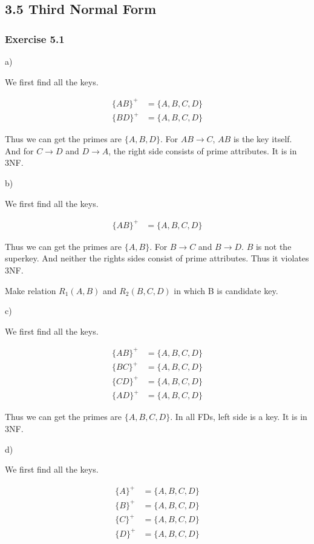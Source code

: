 \documentclass[../../main.tex]{subfiles}
\begin{document}
\subsection{3.5 Third Normal Form}

\subsubsection*{Exercise 5.1}

a)

We first find all the keys.

\begin{align*}
  \{AB\}^{+} &= \{A,B,C,D\} \\
  \{BD\}^{+} &= \{A,B,C,D\}
\end{align*}

Thus we can get the primes are $\{A, B, D\}$. For $AB \to C$,
$AB$ is the key itself. And for $C \to D$ and $D \to A$, the
right side consists of prime attributes. It is in 3NF.

b)

We first find all the keys.

\begin{align*}
  \{AB\}^{+} &= \{A,B,C,D\}
\end{align*}

Thus we can get the primes are $\{A, B\}$. For $B \to C$
and $B \to D$. $B$ is not the superkey. And neither the rights
sides consist of prime attributes. Thus it violates 3NF.

Make relation $R_{1}(A,B)$ and $R_{2}(B,C,D)$ in which B is candidate key.

c)

We first find all the keys.

\begin{align*}
  \{AB\}^{+} &= \{A,B,C,D\} \\
  \{BC\}^{+} &= \{A,B,C,D\} \\
  \{CD\}^{+} &= \{A,B,C,D\} \\
  \{AD\}^{+} &= \{A,B,C,D\}
\end{align*}

Thus we can get the primes are $\{A, B, C, D\}$. In all FDs, left side
is a key. It is in 3NF.

d)

We first find all the keys.

\begin{align*}
  \{A\}^{+} &= \{A,B,C,D\} \\
  \{B\}^{+} &= \{A,B,C,D\} \\
  \{C\}^{+} &= \{A,B,C,D\} \\
  \{D\}^{+} &= \{A,B,C,D\}
\end{align*}
\end{document}
